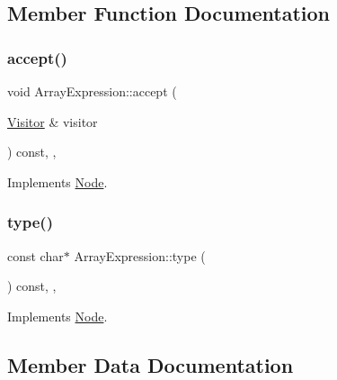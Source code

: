 \subsection{Member Function Documentation}
\mbox{\label{struct_array_expression_a6f1d854ef3cfe2731aee50a45c774b5d}} 
\subsubsection{\texorpdfstring{accept()}{accept()}}
{\footnotesize\ttfamily void Array\+Expression\+::accept (\begin{DoxyParamCaption}\item[{\hyperlink{struct_visitor}{Visitor} \&}]{visitor }\end{DoxyParamCaption}) const\hspace{0.3cm}{\ttfamily [inline]}, {\ttfamily [override]}, {\ttfamily [virtual]}}



Implements \hyperlink{struct_node_a10bd7af968140bbf5fa461298a969c71}{Node}.

\mbox{\label{struct_array_expression_ad0e148cb5a9de93a554e756cde23103e}} 
\subsubsection{\texorpdfstring{type()}{type()}}
{\footnotesize\ttfamily const char$\ast$ Array\+Expression\+::type (\begin{DoxyParamCaption}{ }\end{DoxyParamCaption}) const\hspace{0.3cm}{\ttfamily [inline]}, {\ttfamily [override]}, {\ttfamily [virtual]}}



Implements \hyperlink{struct_node_a82f29420d0a38efcc370352528e94e9b}{Node}.



\subsection{Member Data Documentation}
\mbox{\label{struct_array_expression_a5eaa8dd89911611323de0d6f8221ac1d}} 
